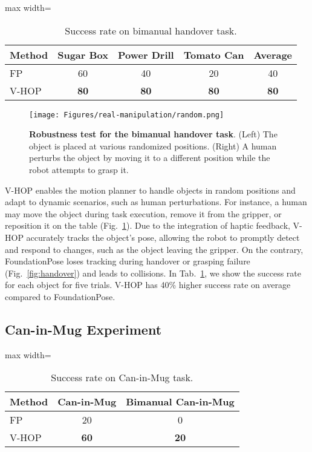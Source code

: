 \documentclass[11pt, a4paper, logo, twocolumn]{brown}
\newcommand{\autosizeTable}[1]{%
    \begin{adjustbox}{max width=\linewidth}
        #1
    \end{adjustbox}
}
\newcommand{\shortname}{V-HOP\xspace}
\begin{document}
\begin{table}[t!]
\centering
\autosizeTable{
\begin{tabular}{l | c | c | c | c}
\hline
Method & Sugar Box & Power Drill & Tomato Can & Average \\ \hline
FP & 60 & 40 & 20 & 40 \\ 
\shortname & \cellcolor{gold}\textbf{80} & \cellcolor{gold}\textbf{80} & \cellcolor{gold}\textbf{80} & \cellcolor{gold}\textbf{80} \\ 
\hline
\end{tabular}
}
\caption{Success rate on bimanual handover task.}
\label{tab:bimanual_success}
\end{table}

\begin{figure}[h!]
    \centering
    \texttt{[image: Figures/real-manipulation/random.png]}
    \caption{
    \textbf{Robustness test for the bimanual handover task}.
    (Left) The object is placed at various randomized positions. 
    (Right) A human perturbs the object by moving it to a different position while the robot attempts to grasp it. 
    }
    \label{fig:randomize-position}
\end{figure}

\shortname enables the motion planner to handle objects in random positions and adapt to dynamic scenarios, such as human perturbations. 
For instance, a human may move the object during task execution, remove it from the gripper, or reposition it on the table (Fig.~\ref{fig:randomize-position}). 
Due to the integration of haptic feedback, \shortname accurately tracks the object’s pose, allowing the robot to promptly detect and respond to changes, such as the object leaving the gripper.
On the contrary, FoundationPose loses tracking during handover or grasping failure (Fig.~\ref{fig:handover}) and leads to collisions.
In Tab.~\ref{tab:bimanual_success}, we show the success rate for each object for five trials.
V-HOP has 40\% higher success rate on average compared to FoundationPose.

\subsection{Can-in-Mug Experiment}

\begin{table}[t!]
\centering
\autosizeTable{
\begin{tabular}{l | c | c }
\hline
Method &  Can-in-Mug & Bimanual Can-in-Mug \\ \hline
FP & 20 & 0 \\ 
\shortname & \cellcolor{gold}\textbf{60} & \cellcolor{gold}\textbf{20} \\ 
\hline
\end{tabular}
}
\caption{Success rate on Can-in-Mug task.}
\label{tab:can_in_cup_success}
\end{table}
\end{document}
